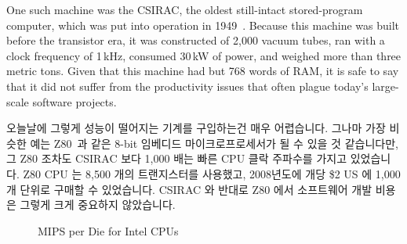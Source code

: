 One such machine was the CSIRAC, the oldest still-intact stored-program
computer, which was put into operation in
1949~\cite{CSIRACMuseumVictoria,CSIRACUniversityMelbourne}.
Because this machine was built before the transistor era, it was constructed
of 2,000 vacuum tubes, ran with a clock frequency of 1\,kHz,
consumed 30\,kW of power, and weighed more than three metric tons.
Given that this machine had but 768 words of RAM, it is safe to say that
it did not suffer from the productivity issues that often plague
today's large-scale software projects.
\fi

오늘날에 그렇게 성능이 떨어지는 기계를 구입하는건 매우 어렵습니다.
그나마 가장 비슷한 예는 Z80~\cite{z80Wikipedia}과 같은 8-bit 임베디드
마이크로프로세서가 될 수 있을 것 같습니다만, 그 Z80 조차도 CSIRAC 보다 1,000
배는 빠른 CPU 클락 주파수를 가지고 있었습니다.
Z80 CPU 는 8,500 개의 트랜지스터를 사용했고, 2008년도에 개당 \$2 US 에 1,000개
단위로 구매할 수 있었습니다.
CSIRAC 와 반대로 Z80 에서 소프트웨어 개발 비용은 그렇게 크게 중요하지
않았습니다.

\begin{figure}[tb]
\centering
{}
\caption{MIPS per Die for Intel CPUs}
\label{fig:intro:MIPS per Die for Intel CPUs}
\end{figure}

